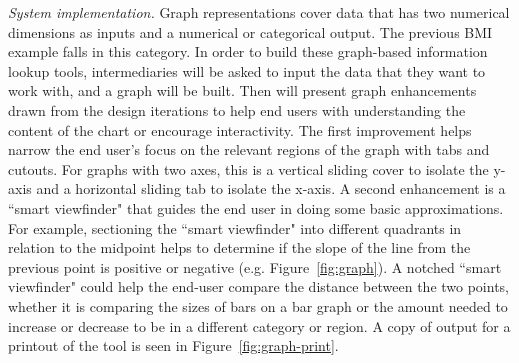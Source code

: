 \documentclass{sig-alternate}
\begin{document}
\emph{System implementation.}
Graph representations cover data that has two numerical dimensions as inputs and a numerical or categorical output. The previous BMI example falls in this category. In order to build these graph-based information lookup tools, intermediaries will be asked to input the data that they want to work with, and a graph will be built. Then \nifty will present graph enhancements drawn from the design iterations to help end users with understanding the content of the chart or encourage interactivity. 
The first improvement helps narrow the end user's focus on the relevant regions of the graph with tabs and cutouts. For graphs with two axes, this is a vertical sliding cover to isolate the y-axis and a horizontal sliding tab to isolate the x-axis. 
A second enhancement is a ``smart viewfinder" that guides the end user in doing some basic approximations. For example, sectioning the ``smart viewfinder" into different quadrants in relation to the midpoint helps to determine if the slope of the line from the previous point is positive or negative (e.g. Figure~\ref{fig:graph}). A notched ``smart viewfinder" could help the end-user compare the distance between the two points, whether it is comparing the sizes of bars on a bar graph or the amount needed to increase or decrease to be in a different category or region. A copy of output for a printout of the tool is seen in Figure~\ref{fig:graph-print}.

\end{document}
